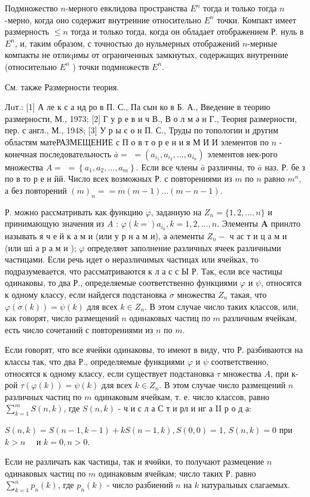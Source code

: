 \documentclass[10pt]{article}
\begin{document}
Подмножество $n$-мерного евклидова пространства $E^{n}$ тогда и только тогда $n$-мерно, когда оно содержит внутренние относительно $E^{n}$ точки. Компакт имеет размерность $\leqslant n$ тогда и только тогда, когда он обладает отображением Р. нуль в $E^{n}$, и, таким образом, с точностью до нульмерных отображений $n$-мерные компакты не отлиqимы от ограниченных замкнутых, содержащих внутренние (относительно $E^{n}$ ) точки подмножеств $E^{n}$.



См. также Размерности теория.



Лuт.: [1] А ле к с а нд ро в П. С., Па сын ко в Б. А., Введение в теорию размерности, М., 1973; [2] Г у р е в и ч В., В о л м ә н Г., Теория размерности, пер. с англ., М., 1948; [3] У р ы с о н П. С., Труды по топологии и другим областям матеРАЗМЕЩЕНИЕ с П о в т о р е н и я М И И элементов по $n$ - конечная последовательность $\bar{a}=$ $=\left(a_{i_{1}}, a_{i_{2}}, \ldots, a_{i_{n}}\right)$ элементов нек-рого множества $A=$ $=\left\{a_{1}, a_{2}, \ldots, a_{m}\right\}$. Если все члены $\bar{a}$ различны, то $\bar{a}$ наз. Р. бе з по в то р е н йй. Число всех возможных Р. с повторениями из $m$ по $n$ равно $m^{n}$, а без повторений $(m)_{n}==m(m-1) \ldots(m-n-1)$.



Р. можно рассматривать как функцию $\varphi$, заданную на $Z_{n}=\{1,2, \ldots, n\}$ и принимающую значения из $A$ : $\varphi(k=) a_{i_{k}}, k=1,2, \ldots, n$. Элементы $\boldsymbol{A}$ принлто называть я ч е й к а м и (или у р н а м и), а әлементы $Z_{n}-$ ч ас т и ц а м и (или ші а р а м и ); $\varphi$ определяөт заполнение различных ячеек различными частицами. Если речь идет о неразличимых частицах или ячейках, то подразумевается, что рассматриваются к л а с с Ы Р. Так, если все частицы одинаковы, то два Р., определяемые соответственно функциями $\varphi$ и $\psi$, относятся к одному классу, если найдегся подстановка $\sigma$ множества $Z_{n}$ такая, что $\varphi(\sigma(k))=\psi(k)$ для всех $k \in Z_{n}$. В этом случае число таких классов, или, как говорят, число размещений $n$ одинаковых частиц по $m$ различным ячейкам, есть число сочетаний с повторениями из $n$ по $m$.



Если говорят, что все ячейки одинаковы, то имеют в виду, что Р. разбиваются на классы так, что два Р., определяемые функциями $\varphi$ и $\psi$ соответственно, относятся к одному классу, если существует подстановка $\tau$ множества $A$, при к-рой $\tau(\varphi(k))=\psi(k)$ для всех $k \in Z_{n}$. В этом случае число размещений $n$ различных частиц по $m$ одинаковым ячейкам, т. е. число классов, равно $\sum_{k=1}^{m} S(n, k)$, где $S(n, k)$ - ч и с л а С т и рл и нг а II р о д а:



$S(n, k)=S(n-1, k-1)+k S(n-1, k), S(0,0)=1$, $S(n, k)=0$ при $k>n \quad$ и $k=0, n>0$.



Если не различать как частицы, так и ячөйки, то получают размецение $n$ одинаковых частиц по $m$ одинаковым ячейкам; число таких Р. равно $\sum_{k=1}^{n} p_{n}(k)$, где $p_{n}(k)$ - число разбиений $n$ на $k$ натуральных слагаемых.
\end{document}

